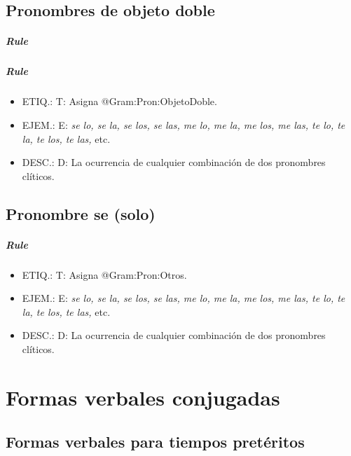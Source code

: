 \documentclass[11pt]{report}
\begin{document}
\section{Pronombres de objeto doble}
\paragraph*{Rule}
\paragraph*{Rule}
\begin{itemize}
\item ETIQ.:  T: Asigna @Gram:Pron:ObjetoDoble.
\item EJEM.:  E: \emph{se lo, se la, se los, se las, me lo, me la, me los, me las, te lo, te la, te los, te las,} etc.
\item DESC.:  D: La ocurrencia de cualquier combinación de dos pronombres clíticos.
\end{itemize}

\section{Pronombre se (solo)}
\paragraph*{Rule}
\begin{itemize}
\item ETIQ.:  T: Asigna @Gram:Pron:Otros.
\item EJEM.:  E: \emph{se lo, se la, se los, se las, me lo, me la, me los, me las, te lo, te la, te los, te las,} etc.
\item DESC.:  D: La ocurrencia de cualquier combinación de dos pronombres clíticos.
\end{itemize}

\chapter{Formas verbales conjugadas}
\section{Formas verbales para tiempos pretéritos}
\end{document}

